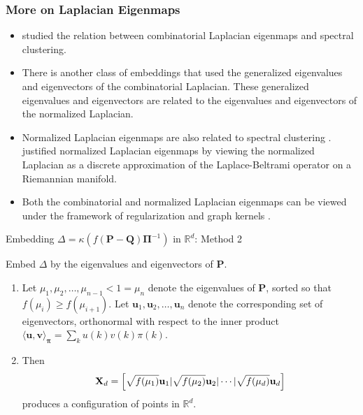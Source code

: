 \documentclass[professionalfonts, hyperref={pdfpagelabels=false,
  colorlinks=true, linkcolor=purple}]{beamer}
\begin{document}
\begin{frame}
  \frametitle{More on Laplacian Eigenmaps}
  \begin{itemize}
  \item \cite{saerens04} studied the relation between
    combinatorial Laplacian eigenmaps and spectral clustering.
  \item There is another class of embeddings that used the
    \alert{generalized} eigenvalues and eigenvectors of the
    combinatorial Laplacian. These generalized eigenvalues and
    eigenvectors are related to the eigenvalues and eigenvectors of
    the \alert{normalized} Laplacian.
  \item Normalized Laplacian eigenmaps are also related to spectral
    clustering \cite{shi97:_normal}. \cite{belkin03:_laplac} justified
    normalized Laplacian eigenmaps by viewing the normalized Laplacian
    as a discrete approximation of the Laplace-Beltrami operator on a
    Riemannian manifold.
  \item Both the combinatorial and normalized Laplacian eigenmaps can
    be viewed under the framework of regularization and graph
    kernels \cite{smola03:_kernel}.
  \end{itemize}
\end{frame}

\begin{frame}{Embedding $\Delta = \kappa(f(\mathbf{P} -
    \mathbf{Q})\bm{\Pi}^{-1})$ in $\mathbb{R}^{d}$: Method 2}

 Embed $\Delta$ by the eigenvalues and eigenvectors of $\mathbf{P}$. 
 \vskip10pt
  \begin{enumerate}
  \item Let $\mu_1, \mu_2, \dots, \mu_{n-1} < 1 = \mu_n$ denote the
    eigenvalues of $\mathbf{P}$, sorted so that $f(\mu_{i}) \geq
    f(\mu_{i+1})$. Let $\bm{u}_1, \bm{u}_2, \dots, \bm{u}_{n}$ denote
    the corresponding set of eigenvectors, orthonormal with respect to
    the inner product $\langle \bm{u}, \bm{v} \rangle_{\bm{\pi}} =
    \sum_{k}{u(k) v(k) \pi(k)}$.
  \item \vskip10pt Then
    \begin{equation*}
      \mathbf{X}_d = \Bigl[ \sqrt{f(\mu_1)} \mathbf{u}_1 |
      \sqrt{f(\mu_2)} \mathbf{u}_{2} | \cdots |
      \sqrt{f(\mu_d)} \mathbf{u}_d \Bigr]
    \end{equation*}
    produces a configuration of points in $\mathbb{R}^{d}$.
  \end{enumerate}
\end{frame}
\end{document}
